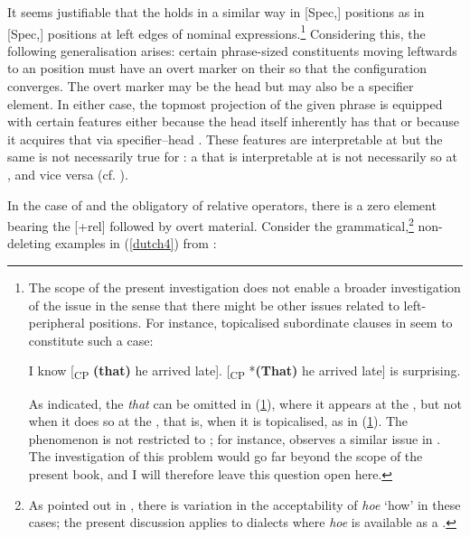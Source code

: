 It seems justifiable that the  holds in a similar way in [Spec,] positions as in [Spec,] positions at left edges of nominal expressions.\footnote{The scope of the present investigation does not enable a broader investigation of the issue in the sense that there might be other  issues related to left-peripheral positions. For instance, topicalised subordinate clauses in  seem to constitute such a case:

\ea	I know [\textsubscript{CP} \textbf{(that)} he arrived late]. \label{thatcomplement}
\z
\ea	{}[\textsubscript{CP} *\textbf{(That)} he arrived late] is surprising. \label{thatfronted}
\z 

As indicated, the  \textit{that} can be omitted in (\ref{thatcomplement}), where it appears at the , but not when it does so at the , that is, when it is topicalised, as in (\ref{thatfronted}). The phenomenon is not restricted to ; for instance, \citet{poletto1995} observes a similar issue in . The investigation of this problem would go far beyond the scope of the present book, and I will therefore leave this question open here.} Considering this, the following generalisation arises: certain phrase-sized constituents moving leftwards to an  position must have an overt marker on their  so that the configuration converges. The overt marker may be the head but may also be a specifier element. In either case, the topmost projection of the given phrase is equipped with certain features either because the head itself inherently has that  or because it acquires that  via specifier–head . These features are interpretable at  but the same is not necessarily true for : a  that is interpretable at  is not necessarily so at , and vice versa (cf. \citealt[223]{tsimplidimitrakopoulou2007}).

In the case of  and the obligatory  of relative operators, there is a zero element bearing the [+rel]  followed by overt material. Consider the grammatical,\footnote{As pointed out in , there is variation in the acceptability of \textit{hoe} `how' in these cases; the present discussion applies to dialects where \textit{hoe} is available as a .} non-deleting examples in (\ref{dutch4}) from :

